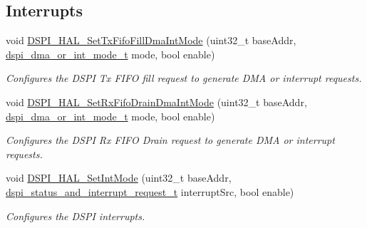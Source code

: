 \subsection*{Interrupts}
\begin{DoxyCompactItemize}
\item 
void \hyperlink{group__dspi__hal_ga39e1c8668d664e897a0eba1efa99a79b}{D\+S\+P\+I\+\_\+\+H\+A\+L\+\_\+\+Set\+Tx\+Fifo\+Fill\+Dma\+Int\+Mode} (uint32\+\_\+t base\+Addr, \hyperlink{group__dspi__hal_ga8a47ddde41f47a45d797d000b6f5e6f8}{dspi\+\_\+dma\+\_\+or\+\_\+int\+\_\+mode\+\_\+t} mode, bool enable)
\begin{DoxyCompactList}\small\item\em Configures the D\+S\+PI Tx F\+I\+FO fill request to generate D\+MA or interrupt requests. \end{DoxyCompactList}\item 
void \hyperlink{group__dspi__hal_ga3ae755726cfcdb0e1b1dd97124ddf70c}{D\+S\+P\+I\+\_\+\+H\+A\+L\+\_\+\+Set\+Rx\+Fifo\+Drain\+Dma\+Int\+Mode} (uint32\+\_\+t base\+Addr, \hyperlink{group__dspi__hal_ga8a47ddde41f47a45d797d000b6f5e6f8}{dspi\+\_\+dma\+\_\+or\+\_\+int\+\_\+mode\+\_\+t} mode, bool enable)
\begin{DoxyCompactList}\small\item\em Configures the D\+S\+PI Rx F\+I\+FO Drain request to generate D\+MA or interrupt requests. \end{DoxyCompactList}\item 
void \hyperlink{group__dspi__hal_ga33301419ad92394cc238fc4ae5c020b9}{D\+S\+P\+I\+\_\+\+H\+A\+L\+\_\+\+Set\+Int\+Mode} (uint32\+\_\+t base\+Addr, \hyperlink{group__dspi__hal_ga59af3ccb7f04892167dc3ddf75cf2696}{dspi\+\_\+status\+\_\+and\+\_\+interrupt\+\_\+request\+\_\+t} interrupt\+Src, bool enable)
\begin{DoxyCompactList}\small\item\em Configures the D\+S\+PI interrupts. \end{DoxyCompactList}\end{DoxyCompactItemize}

